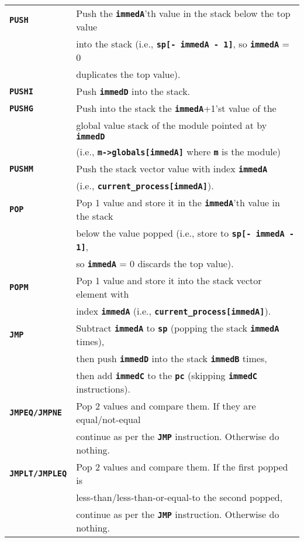 \documentclass[12pt]{article}
\newcommand{\TT}[1]{{\tt \bfseries #1}}
\newlength{\figurewidth}
\newenvironment{boxedfigure}[1][!btp]%
	{\begin{figure*}[#1]
	 \begin{lrbox}{\figurebox}
	 \begin{minipage}{\figurewidth}

	 \vspace*{1ex}}%
	{
	 \vspace*{1ex}

	 \end{minipage}
	 \end{lrbox}

	 \centering
	 \fbox{\hspace*{0.1in}\usebox{\figurebox}\hspace*{0.1in}}
	 \end{figure*}}
\begin{document}
\begin{boxedfigure}

\begin{center}
\begin{tabular}{|l|l|}
\hline
\TT{PUSH}
    & Push the \TT{immedA}'th value in the stack below the top value \\
    & into the stack (i.e., \TT{sp[- immedA - 1]},
      so \TT{immedA} = 0 \\
    & duplicates the top value).
\\\hline
\TT{PUSHI}
    & Push \TT{immedD} into the stack.
\\\hline
\TT{PUSHG}
    & Push into the stack the \TT{immedA}+1'st value of the \\
    & global value stack of the module pointed at by \TT{immedD} \\
    & (i.e., \TT{m->globals[immedA]} where \TT{m} is the module)
\\\hline
\TT{PUSHM}
    & Push the stack vector value with index \TT{immedA} \\
    & (i.e., \TT{current\_process[immedA]}).
\\\hline
\TT{POP}
    & Pop 1 value and store it in the \TT{immedA}'th value in the stack \\
    & below the value popped (i.e., store to \TT{sp[- immedA - 1]}, \\
    & so \TT{immedA} = 0 discards the top value).
\\\hline
\TT{POPM}
    & Pop 1 value and store it into the stack vector element with \\
    & index \TT{immedA} (i.e., \TT{current\_process[immedA]}).
\\\hline
\TT{JMP}
    & Subtract \TT{immedA} to \TT{sp} (popping the stack \TT{immedA} times), \\
    & then push \TT{immedD} into the stack \TT{immedB} times, \\
    & then add \TT{immedC} to the \TT{pc} (skipping \TT{immedC} instructions).
\\\hline
\TT{JMPEQ/JMPNE}
    & Pop 2 values and compare them.  If they are equal/not-equal \\
    & continue as per the \TT{JMP} instruction.  Otherwise do nothing.
\\\hline
\TT{JMPLT/JMPLEQ}
    & Pop 2 values and compare them.  If the first popped is \\
    & less-than/less-than-or-equal-to the second popped, \\
    & continue as per the \TT{JMP} instruction.  Otherwise do nothing.

\end{tabular}
\end{center}
\end{boxedfigure}
\end{document}
